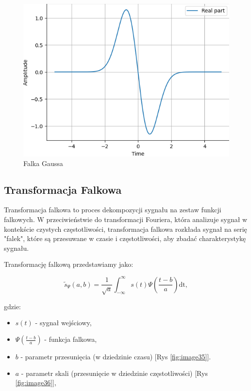 \begin{figure}[ht]
    \begin{minipage}[t]{0.3\linewidth}
        \includegraphics[width=\linewidth]{Rozdziały/02.Podstawy_teoretyczne/Obrazy/wavelet_gaus1.png}
        \caption{Falka Gaussa}
        \label{fig:image33}
    \end{minipage}
\end{figure}


\subsection*{Transformacja Falkowa}

Transformacja falkowa to proces dekompozycji sygnału na zestaw funkcji falkowych. W przeciwieństwie do transformacji Fouriera, która analizuje sygnał w kontekście czystych częstotliwości, transformacja falkowa rozkłada sygnał na serię "falek", które są przesuwane w czasie i częstotliwości, aby zbadać charakterystykę sygnału.


Transformację falkową przedstawiamy jako:

\begin{equation*}
    \tilde{s}_{\Psi}(a, b)=\frac{1}{\sqrt{a}} \int_{-\infty}^{\infty} s(t) \Psi\left(\frac{t-b}{a}\right) \mathrm{dt},
\end{equation*}

gdzie:
\begin{itemize}
    \item $s(t)$ - sygnał wejściowy,
    \item $\Psi\left(\frac{t-b}{a}\right)$ - funkcja falkowa,
    \item $b$ - parametr przesunięcia (w dziedzinie czasu) [Rys \ref{fig:image35}].
    \item $a$ - parametr skali (przesunięcie w dziedzinie częstotliwości) [Rys \ref{fig:image36}],
\end{itemize}



